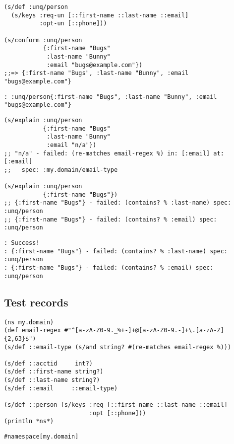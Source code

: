\documentclass[10pt,oneside,x11names]{article}
\begin{document}
\begin{verbatim}
(s/def :unq/person
  (s/keys :req-un [::first-name ::last-name ::email]
          :opt-un [::phone]))

(s/conform :unq/person
           {:first-name "Bugs"
            :last-name "Bunny"
            :email "bugs@example.com"})
;;=> {:first-name "Bugs", :last-name "Bunny", :email "bugs@example.com"}
\end{verbatim}

\begin{verbatim}
: :unq/person{:first-name "Bugs", :last-name "Bunny", :email "bugs@example.com"}
\end{verbatim}

\begin{verbatim}
(s/explain :unq/person
           {:first-name "Bugs"
            :last-name "Bunny"
            :email "n/a"})
;; "n/a" - failed: (re-matches email-regex %) in: [:email] at: [:email]
;;   spec: :my.domain/email-type

(s/explain :unq/person
           {:first-name "Bugs"})
;; {:first-name "Bugs"} - failed: (contains? % :last-name) spec: :unq/person
;; {:first-name "Bugs"} - failed: (contains? % :email) spec: :unq/person
\end{verbatim}

\begin{verbatim}
: Success!
: {:first-name "Bugs"} - failed: (contains? % :last-name) spec: :unq/person
: {:first-name "Bugs"} - failed: (contains? % :email) spec: :unq/person
\end{verbatim}

\subsection{Test records}
\label{sec:org50bb762}

\begin{verbatim}
(ns my.domain)
(def email-regex #"^[a-zA-Z0-9._%+-]+@[a-zA-Z0-9.-]+\.[a-zA-Z]{2,63}$")
(s/def ::email-type (s/and string? #(re-matches email-regex %)))

(s/def ::acctid     int?)
(s/def ::first-name string?)
(s/def ::last-name string?)
(s/def ::email     ::email-type)

(s/def ::person (s/keys :req [::first-name ::last-name ::email]
                        :opt [::phone]))
(println *ns*)
\end{verbatim}

\begin{verbatim}
#namespace[my.domain]
\end{verbatim}
\end{document}
